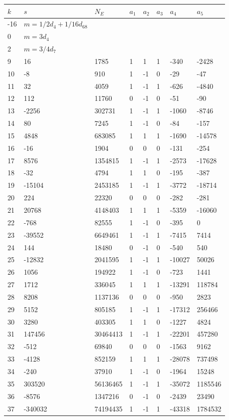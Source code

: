 \documentclass{amsart}
\begin{document}
\begin{longtable}{|l|l|l|lllll|}
\hline
$k$ & $s$ & $N_E$ & $a_1$ & $a_2$ & $a_3$ & $a_4$ & $a_5$\\
\hline
-16&$m=1/2d_{4}+1/16d_{68}$&&\multicolumn{5}{c|}{}\\
0&$m=3d_{4}$&&\multicolumn{5}{c|}{}\\
2&$m=3/4d_{7}$&&\multicolumn{5}{c|}{}\\
9&16&1785&1&1&1&-340&-2428\\
10&-8&910&1&-1&0&-29&-47\\
11&32&4059&1&-1&1&-626&-4840\\
12&112&11760&0&-1&0&-51&-90\\
13&-2256&302731&1&-1&1&-1060&-8746\\
14&80&7245&1&-1&0&-84&-157\\
15&4848&683085&1&1&1&-1690&-14578\\
16&-16&1904&0&0&0&-131&-254\\
17&8576&1354815&1&-1&1&-2573&-17628\\
18&-32&4794&1&1&0&-195&-387\\
19&-15104&2453185&1&-1&1&-3772&-18714\\
20&224&22320&0&0&0&-282&-281\\
21&20768&4148403&1&1&1&-5359&-16060\\
22&-768&82555&1&-1&0&-395&0\\
23&-39552&6649461&1&-1&1&-7415&7414\\
24&144&18480&0&-1&0&-540&540\\
25&-12832&2041595&1&-1&1&-10027&50026\\
26&1056&194922&1&-1&0&-723&1441\\
27&1712&336045&1&1&1&-13291&118784\\
28&8208&1137136&0&0&0&-950&2823\\
29&5152&805185&1&-1&1&-17312&256466\\
30&3280&403305&1&1&0&-1227&4824\\
31&147456&30464413&1&-1&1&-22201&457280\\
32&-512&69840&0&0&0&-1563&9162\\
33&-4128&852159&1&1&1&-28078&737498\\
34&-240&37910&1&-1&0&-1964&15248\\
35&303520&56136465&1&-1&1&-35072&1185546\\
36&-8576&1347216&0&-1&0&-2439&23490\\
37&-340032&74194435&1&-1&1&-43318&1784532\\

\end{longtable}
\end{document}
